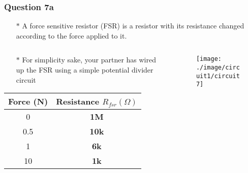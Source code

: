 \documentclass{beamer}
\begin{document}

\begin{frame}
\frametitle{Question 7a}
\begin{itemize} \itemsep1pt \parskip0pt 
  \item[$\ast$] A force sensitive resistor (FSR) is a resistor with its resistance changed according to the force applied to it.
\end{itemize}

\begin{columns}

\begin{column}{6cm}
\begin{itemize} \itemsep1pt \parskip0pt 
  \item[$\ast$] For simplicity sake, your partner has wired up the FSR using a simple potential divider circuit
\end{itemize}
\begin{table}
\begin{center}
\def\arraystretch{1.5}
\begin{tabular}{|c||c|}
\hline
Force (N) & Resistance $R_{fsr} (\Omega)$ \\
\hline
0     & \bf{1M}\\
\hline
0.5   & \bf{10k}\\
\hline
1     & \bf{6k}\\
\hline
10    & \bf{1k}\\
\hline
\end{tabular}
\end{center}
\end{table}

\end{column}


\begin{column}{6cm}
\begin{figure}[H]
  \centering
  \texttt{[image: ./image/circuit1/circuit7]}
\end{figure}
\end{column}

\end{columns}

\end{frame}

\end{document}
